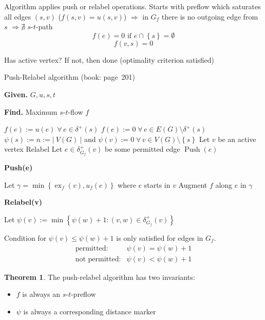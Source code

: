 \documentclass[a4paper]{article}
\theoremstyle{definition}
\newtheorem{theorem}{Theorem}
\newcommand{\card}[1]{\left|\:\!#1\:\!\right|}
\newcommand{\set}[1]{\left\{#1\right\}}
\newcommand{\given}[1]{\textbf{Given.} #1\par}
\newcommand{\find}[1]{\textbf{Find.} #1\par}
\newcommand{\gath}[2]{$#1$-$#2$-path} %
\newcommand{\flow}[2]{$#1$-$#2$-flow}
\newcommand{\fall}{\;\forall\,}
\begin{document}
Algorithm applies push or relabel operations. Starts with preflow which saturates all edges $(s, v)$ ($f(s,v) = u(s,v)$) $\Rightarrow$ in $G_f$ there is no outgoing edge from $s$ $\Rightarrow \nexists$ \gath st
\[
  f(e) = 0 \text{ if } e \cap \set{s} = \emptyset
\] \[
  f(v,s) = 0
\]

Has active vertex? If not, then done (optimality criterion satisfied)

\begin{algorithm}
  \caption{Push-Relabel algorithm (book: page~201)}
  \label{push-relabel-algo}
  \given{$G, u, s, t$}
  \find{Maximum \flow st $f$}
\begin{algorithmic}[1]
  \State $f(e) := u(e) \fall e \in \delta^+(s)$
  \State $f(e) := 0 \fall e \in E(G) \setminus \delta^+(s)$
  \State $\psi(s) := n := \card{V(G)}$ and $\psi(v) := 0 \fall v \in V(G) \setminus \set{s}$
    \State Let $v$ be an active vertex
      \State Relabel
    \Else
      \State Let $e \in \delta_{G_f}^+(v)$ be some permitted edge
      \State $\operatorname{Push}(e)$
    \EndIf
  \EndWhile
\end{algorithmic}
\textbf{Push(e)}
\begin{algorithmic}[1]
  \State Let $\gamma = \min\set{\operatorname{ex}_f(v), u_f(e)}$ where $e$ starts in $v$
  \State Augment $f$ along $e$ in $\gamma$
\end{algorithmic}
\textbf{Relabel(v)}
\begin{algorithmic}[1]
  \State Let $\psi(v) := \min\set{\psi(w) + 1: (v, w) \in \delta^+_{G_f}(v)}$
\end{algorithmic}
\end{algorithm}

Condition for $\psi(v) \leq \psi(w) + 1$ is only satisfied for edges in $G_f$.
\[
  \begin{array}{ll}
    \text{permitted:} & \psi(v) = \psi(w) + 1 \\
    \text{not permitted:} & \psi(v) < \psi(w) + 1
  \end{array}
\]

\begin{theorem}\label{proposition-4.8}
  The push-relabel algorithm has two invariants:
  \begin{itemize}
    \item $f$ is always an $s$-$t$-preflow
    \item $\psi$ is always a corresponding distance marker
  \end{itemize}
\end{theorem}
\end{document}
